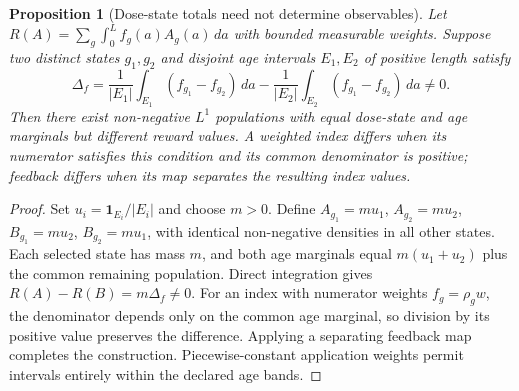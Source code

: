 \documentclass[10pt,letterpaper]{article}
\newtheorem{proposition}{Proposition}
\begin{document}
\begin{proposition}[Dose-state totals need not determine observables]
Let $R(A)=\sum_g\int_0^L f_g(a)A_g(a)\,da$ with bounded measurable weights. Suppose two distinct states $g_1,g_2$ and disjoint age intervals $E_1,E_2$ of positive length satisfy
\begin{equation}
 \Delta_f=\frac{1}{|E_1|}\int_{E_1}(f_{g_1}-f_{g_2})\,da
          -\frac{1}{|E_2|}\int_{E_2}(f_{g_1}-f_{g_2})\,da\ne0.
 \label{eq:interval_cross_difference}
\end{equation}
Then there exist non-negative $L^1$ populations with equal dose-state and age marginals but different reward values. A weighted index differs when its numerator satisfies this condition and its common denominator is positive; feedback differs when its map separates the resulting index values.
\end{proposition}
\begin{proof}
Set $u_i=\mathbf1_{E_i}/|E_i|$ and choose $m>0$. Define $A_{g_1}=mu_1$, $A_{g_2}=mu_2$, $B_{g_1}=mu_2$, $B_{g_2}=mu_1$, with identical non-negative densities in all other states. Each selected state has mass $m$, and both age marginals equal $m(u_1+u_2)$ plus the common remaining population. Direct integration gives $R(A)-R(B)=m\Delta_f\ne0$. For an index with numerator weights $f_g=\rho_gw$, the denominator depends only on the common age marginal, so division by its positive value preserves the difference. Applying a separating feedback map completes the construction. Piecewise-constant application weights permit intervals entirely within the declared age bands.
\end{proof}
\end{document}

